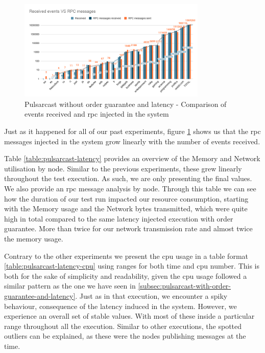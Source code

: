 \begin{figure}[!htb]
  \centering
  \includegraphics[width=0.8\textwidth]{img/graph-pulsarcast-latency-rpc.png}
  \caption{Pulsarcast without order guarantee and latency - Comparison of events received and \acrshort{rpc} injected in the system}
  \label{fig:graph-pulsarcast-latency-rpc}
\end{figure}

Just as it happened for all of our past experiments, figure
\ref{fig:graph-pulsarcast-latency-rpc} shows us that the \acrshort{rpc} messages injected
in the system grow linearly with the number of events received.

Table \ref{table:pulsarcast-latency} provides an overview of the Memory and
Network utilisation by node. Similar to the previous experiments, these grew
linearly throughout the test execution. As such, we are only presenting the
final values. We also provide an \acrshort{rpc} message analysis by node. Through this
table we can see how the duration of our test run impacted our resource
consumption, starting with the Memory usage and the Network bytes transmitted,
which were quite high in total compared to the same latency injected execution
with order guarantee. More than twice for our network transmission rate and
almost twice the memory usage.

Contrary to the other experiments we present the \acrshort{cpu} usage in a table format
\ref{table:pulsarcast-latency-cpu} using ranges for both time and \acrshort{cpu} number.
This is both for the sake of simplicity and readability, given the \acrshort{cpu} usage
followed a similar pattern as the one we have seen in
\ref{subsec:pulsarcast-with-order-guarantee-and-latency}. Just as in that
execution, we encounter a spiky behaviour, consequence of the latency induced
in the system. However, we experience an overall set of stable values. With
most of these inside a particular range throughout all the execution. Similar
to other executions, the spotted outliers can be explained, as these were the
nodes publishing messages at the time.

